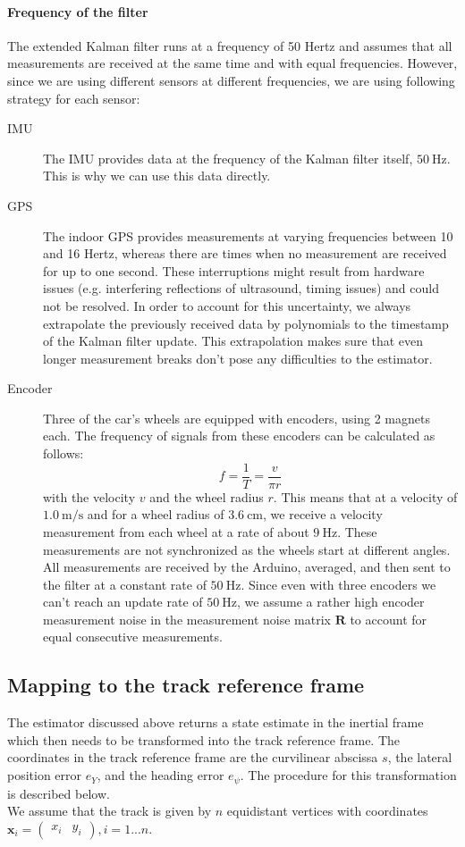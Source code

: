 \paragraph{Frequency of the filter}
The extended Kalman filter runs at a frequency of 50 Hertz and assumes that all measurements are received at the same time and with equal frequencies. However, since we are using different sensors at different frequencies, we are using following strategy for each sensor:
\begin{description}
\item[IMU] The IMU provides data at the frequency of the Kalman filter itself, $\SI{50}{\hertz}$. This is why we can use this data directly.
\item[GPS] The indoor GPS provides measurements at varying frequencies between 10 and 16 Hertz, whereas there are times when no measurement are received for up to one second. These interruptions might result from hardware issues (e.g. interfering reflections of ultrasound, timing issues) and could not be resolved. In order to account for this uncertainty, we always extrapolate the previously received data by  polynomials to the timestamp of the Kalman filter update. This extrapolation makes sure that even longer measurement breaks don't pose any difficulties to the estimator.
\item[Encoder] Three of the car's wheels are equipped with encoders, using 2 magnets each. The frequency of signals from these encoders can be calculated as follows:
\begin{equation}
f =\frac{1}{T}=\frac{v}{\pi r}
\end{equation}
with the velocity $v$ and the wheel radius $r$. This means that at a velocity of $\SI{1.0}{\meter\per\second}$ and for a wheel radius of $\SI{3.6}{\centi\meter}$, we receive a velocity measurement from each wheel at a rate of about $\SI{9}{\hertz}$. These measurements are not synchronized as the wheels start at different angles. All measurements are received by the Arduino, averaged, and then sent to the filter at a constant rate of $\SI{50}{\hertz}$. Since even with three encoders we can't reach an update rate of $\SI{50}{\hertz}$, we assume a rather high encoder measurement noise in the measurement noise matrix $\bm{R}$ to account for equal consecutive measurements.
\end{description}
\subsection{Mapping to the track reference frame}
The estimator discussed above returns a state estimate in the inertial frame which then needs to be transformed into the track reference frame. The coordinates in the track reference frame are the curvilinear abscissa $s$, the lateral position error $e_Y$, and the heading error $e_\psi$. The procedure for this transformation is described below.\\
We assume that the track is given by $n$ equidistant vertices with coordinates $\bm{x}_i = \begin{pmatrix}
x_i&y_i
\end{pmatrix},i=1...n$.


